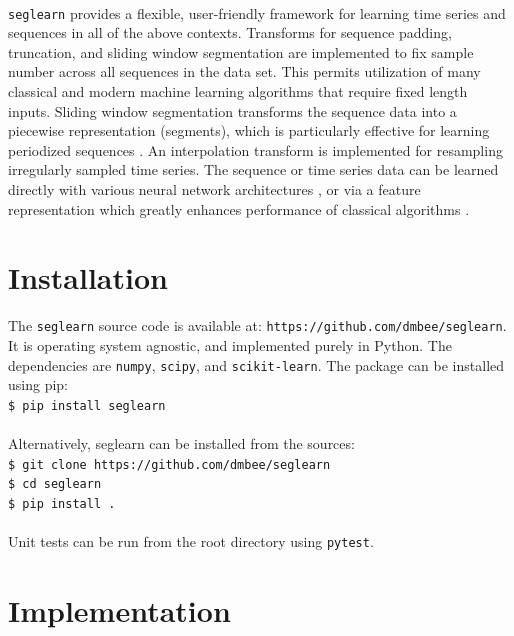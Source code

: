 \documentclass[twoside,11pt]{article}
\begin{document}
\paragraph{}
\texttt{seglearn} provides a flexible, user-friendly framework for learning time series and sequences in all of the above contexts. Transforms for sequence padding, truncation, and sliding window segmentation are implemented to fix sample number across all sequences in the data set. This permits utilization of many classical and modern machine learning algorithms that require fixed length inputs. Sliding window segmentation transforms the sequence data into a piecewise representation (segments), which is particularly effective for learning periodized sequences \citep{bulling_tutorial_2014}. An interpolation transform is implemented for resampling irregularly sampled time series. The sequence or time series data can be learned directly with various neural network architectures \citep{lipton_critical_2015}, or via a feature representation which greatly enhances performance of classical algorithms \citep{bulling_tutorial_2014}. 

\section{Installation}

The \texttt{seglearn} source code is available at: \texttt{https://github.com/dmbee/seglearn}. It is operating system agnostic, and implemented purely in Python. The dependencies are \texttt{numpy}, \texttt{scipy}, and \texttt{scikit-learn}. The package can be installed using pip:  \\
\texttt{\$ pip install seglearn} 
\paragraph{}
Alternatively, seglearn can be installed from the sources: \\
\texttt{\$ git clone https://github.com/dmbee/seglearn} \\
\texttt{\$ cd seglearn} \\
\texttt{\$ pip install .}
\paragraph{}
Unit tests can be run from the root directory using \texttt{pytest}. 


\section{Implementation}
\end{document}
